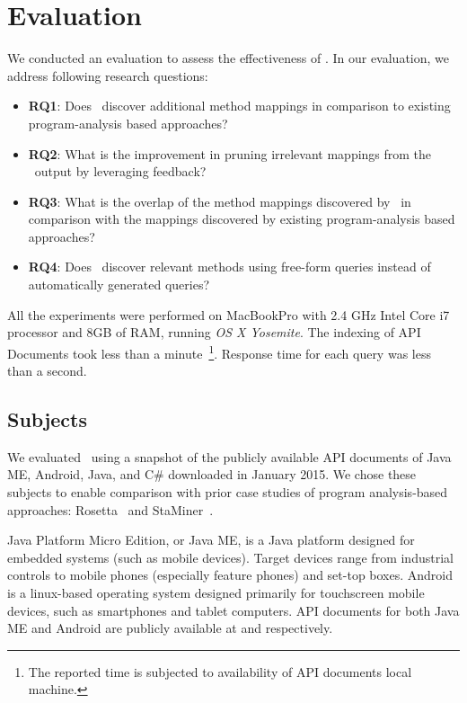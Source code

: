 \section{Evaluation}
\label{sec:evaluation}

We conducted an evaluation to assess the effectiveness of \tool. In our evaluation, we address following research questions:

\begin{itemize}
	
	\item\textbf{RQ1}: Does \tool\ discover additional method mappings in comparison to existing program-analysis based approaches?
	
	\item\textbf{RQ2}: What is the improvement in pruning irrelevant mappings from the \tool\ output by leveraging feedback?
	
	\item\textbf{RQ3}: What is the overlap of the method mappings discovered by \tool\ in comparison with the mappings discovered by existing program-analysis based approaches?
	
	
	\item\textbf{RQ4}: Does \tool\ discover relevant methods using free-form queries instead of automatically generated queries?

\end{itemize}

All the experiments were performed on MacBookPro with 2.4 GHz Intel Core i7 processor and 8GB of RAM, running \emph{OS X Yosemite}. The indexing of API Documents took less than a minute~\footnote{The reported time is subjected to availability of API documents local machine.}. Response time for each query was less than a second.


\subsection{Subjects}
\label{sub:subject}


We evaluated \tool\ using a snapshot of the publicly available API documents of Java ME, Android, Java, and C\# downloaded in January 2015. 
We chose these subjects to enable comparison with prior case studies of program analysis-based approaches: Rosetta~\cite{Gokhale2013ICSE} and StaMiner~\cite{nguyen2014statistical}.

Java Platform Micro Edition, or Java ME, is a Java platform designed for embedded systems (such as mobile devices). Target devices range from industrial controls to mobile phones (especially feature phones) and set-top boxes.
Android is a linux-based operating system designed primarily for touchscreen mobile devices, such as smartphones and tablet computers.
API documents for both Java ME and Android are publicly available at \cite{j2meAPI} and \cite{androidAPI} respectively.

